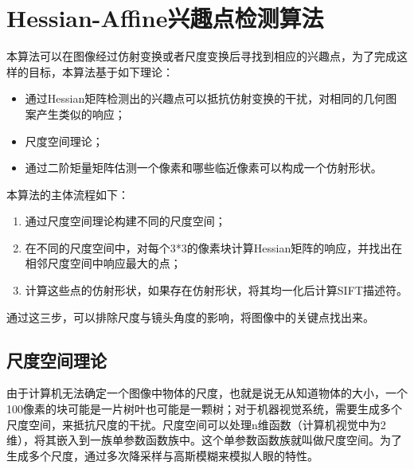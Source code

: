 
\chapter{Hessian-Affine兴趣点检测算法}
\label{chap:algorithm}
  本算法可以在图像经过仿射变换或者尺度变换后寻找到相应的兴趣点，为了完成这样的目标，本算法基于如下理论：
  \begin{itemize}
    \item 通过Hessian矩阵检测出的兴趣点可以抵抗仿射变换的干扰，对相同的几何图案产生类似的响应；
    \item 尺度空间理论；
    \item 通过二阶矩量矩阵估测一个像素和哪些临近像素可以构成一个仿射形状。
  \end{itemize}
  本算法的主体流程如下：
  \begin{enumerate}
    \item 通过尺度空间理论构建不同的尺度空间；
    \item 在不同的尺度空间中，对每个3*3的像素块计算Hessian矩阵的响应，并找出在相邻尺度空间中响应最大的点；
    \item 计算这些点的仿射形状，如果存在仿射形状，将其均一化后计算SIFT描述符。
  \end{enumerate}
  通过这三步，可以排除尺度与镜头角度的影响，将图像中的关键点找出来。

  \section{尺度空间理论}
    由于计算机无法确定一个图像中物体的尺度，也就是说无从知道物体的大小，一个100像素的块可能是一片树叶也可能是一颗树；对于机器视觉系统，需要生成多个尺度空间，来抵抗尺度的干扰。尺度空间可以处理n维函数（计算机视觉中为2维），将其嵌入到一族单参数函数族中。这个单参数函数族就叫做尺度空间。为了生成多个尺度，通过多次降采样与高斯模糊来模拟人眼的特性。
